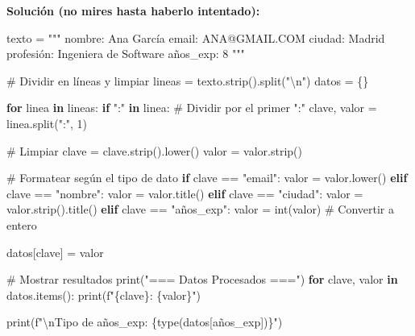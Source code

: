\documentclass[
  doc,
  floatsintext,
  longtable,
  a4paper,
  nolmodern,
  notxfonts,
  notimes,
  12pt,
  colorlinks=true,linkcolor=blue,citecolor=blue,urlcolor=blue]{apa7}
\newenvironment{Shaded}{\begin{snugshade}}{\end{snugshade}}
\newcommand{\BuiltInTok}[1]{\textcolor[rgb]{0.00,0.23,0.31}{#1}}
\newcommand{\CharTok}[1]{\textcolor[rgb]{0.13,0.47,0.30}{#1}}
\newcommand{\CommentTok}[1]{\textcolor[rgb]{0.37,0.37,0.37}{#1}}
\newcommand{\ControlFlowTok}[1]{\textcolor[rgb]{0.00,0.23,0.31}{\textbf{#1}}}
\newcommand{\DecValTok}[1]{\textcolor[rgb]{0.68,0.00,0.00}{#1}}
\newcommand{\KeywordTok}[1]{\textcolor[rgb]{0.00,0.23,0.31}{\textbf{#1}}}
\newcommand{\NormalTok}[1]{\textcolor[rgb]{0.00,0.23,0.31}{#1}}
\newcommand{\OperatorTok}[1]{\textcolor[rgb]{0.37,0.37,0.37}{#1}}
\newcommand{\SpecialCharTok}[1]{\textcolor[rgb]{0.37,0.37,0.37}{#1}}
\newcommand{\SpecialStringTok}[1]{\textcolor[rgb]{0.13,0.47,0.30}{#1}}
\newcommand{\StringTok}[1]{\textcolor[rgb]{0.13,0.47,0.30}{#1}}
\begin{document}
\textbf{Solución (no mires hasta haberlo intentado):}

\begin{Shaded}
\begin{Highlighting}[]
\NormalTok{texto }\OperatorTok{=} \StringTok{"""}
\StringTok{  nombre: Ana García  }
\StringTok{  email: ANA@GMAIL.COM  }
\StringTok{  ciudad:  Madrid   }
\StringTok{  profesión:  Ingeniera de Software  }
\StringTok{  años\_exp:  8  }
\StringTok{"""}

\CommentTok{\# Dividir en líneas y limpiar}
\NormalTok{lineas }\OperatorTok{=}\NormalTok{ texto.strip().split(}\StringTok{"}\CharTok{\textbackslash{}n}\StringTok{"}\NormalTok{)}
\NormalTok{datos }\OperatorTok{=}\NormalTok{ \{\}}

\ControlFlowTok{for}\NormalTok{ linea }\KeywordTok{in}\NormalTok{ lineas:}
    \ControlFlowTok{if} \StringTok{":"} \KeywordTok{in}\NormalTok{ linea:}
        \CommentTok{\# Dividir por el primer ":"}
\NormalTok{        clave, valor }\OperatorTok{=}\NormalTok{ linea.split(}\StringTok{":"}\NormalTok{, }\DecValTok{1}\NormalTok{)}

        \CommentTok{\# Limpiar}
\NormalTok{        clave }\OperatorTok{=}\NormalTok{ clave.strip().lower()}
\NormalTok{        valor }\OperatorTok{=}\NormalTok{ valor.strip()}

        \CommentTok{\# Formatear según el tipo de dato}
        \ControlFlowTok{if}\NormalTok{ clave }\OperatorTok{==} \StringTok{"email"}\NormalTok{:}
\NormalTok{            valor }\OperatorTok{=}\NormalTok{ valor.lower()}
        \ControlFlowTok{elif}\NormalTok{ clave }\OperatorTok{==} \StringTok{"nombre"}\NormalTok{:}
\NormalTok{            valor }\OperatorTok{=}\NormalTok{ valor.title()}
        \ControlFlowTok{elif}\NormalTok{ clave }\OperatorTok{==} \StringTok{"ciudad"}\NormalTok{:}
\NormalTok{            valor }\OperatorTok{=}\NormalTok{ valor.strip().title()}
        \ControlFlowTok{elif}\NormalTok{ clave }\OperatorTok{==} \StringTok{"años\_exp"}\NormalTok{:}
\NormalTok{            valor }\OperatorTok{=} \BuiltInTok{int}\NormalTok{(valor)  }\CommentTok{\# Convertir a entero}

\NormalTok{        datos[clave] }\OperatorTok{=}\NormalTok{ valor}

\CommentTok{\# Mostrar resultados}
\BuiltInTok{print}\NormalTok{(}\StringTok{"=== Datos Procesados ==="}\NormalTok{)}
\ControlFlowTok{for}\NormalTok{ clave, valor }\KeywordTok{in}\NormalTok{ datos.items():}
    \BuiltInTok{print}\NormalTok{(}\SpecialStringTok{f"}\SpecialCharTok{\{}\NormalTok{clave}\SpecialCharTok{\}}\SpecialStringTok{: }\SpecialCharTok{\{}\NormalTok{valor}\SpecialCharTok{\}}\SpecialStringTok{"}\NormalTok{)}

\BuiltInTok{print}\NormalTok{(}\SpecialStringTok{f"}\CharTok{\textbackslash{}n}\SpecialStringTok{Tipo de años\_exp: }\SpecialCharTok{\{}\BuiltInTok{type}\NormalTok{(datos[}\StringTok{\textquotesingle{}años\_exp\textquotesingle{}}\NormalTok{])}\SpecialCharTok{\}}\SpecialStringTok{"}\NormalTok{)}
\end{Highlighting}
\end{Shaded}
\end{document}
